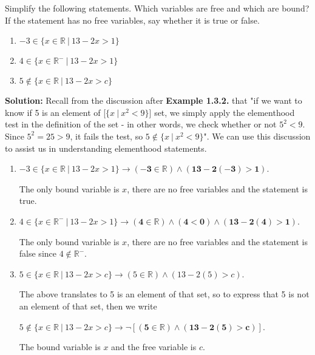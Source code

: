 Simplify the following statements. Which variables are free and which are bound? If the statement has no free variables, say whether it is true or false.
\begin{enumerate}[label=(\alph*)]
    \item $-3 \in \{x \in \mathbb{R} \ | \ 13-2x > 1 \}$
    \item $4 \in \{x \in \mathbb{R}^- \ | \ 13-2x > 1 \}$
    \item $5 \notin \{x \in \mathbb{R} \ | \ 13-2x > c \}$
\end{enumerate}

\textbf{Solution:} Recall from the discussion after \textbf{Example 1.3.2.} that "if we want to know if 5 is an element of [$\{x \ | \ x^2 < 9 \}$] set, we simply apply the elementhood test in the definition of the set - in other words, we check whether or not $5^2 < 9$. Since $5^2=25>9$, it fails the test, so $5 \notin \{x \ | \ x^2 < 9\}$". We can use this discussion to assist us in understanding elementhood statements.
\begin{enumerate}[label=(\alph*)]
    \item $-3 \in \{x \in \mathbb{R} \ | \ 13-2x > 1 \} \rightarrow \bm{(-3 \in \mathbb{R}) \wedge (13-2(-3)>1)}$.
    
    The only bound variable is $x$, there are no free variables and the statement is true.
    
    \item $4 \in \{x \in \mathbb{R}^- \ | \ 13-2x > 1 \} \rightarrow \bm{(4 \in \mathbb{R}) \wedge (4 < 0) \wedge (13-2(4)>1)}$.
    
    The only bound variable is $x$, there are no free variables and the statement is false since $4 \notin \mathbb{R}^-$.

    \item $5 \in \{x \in \mathbb{R} \ | \ 13-2x > c \} \rightarrow (5 \in \mathbb{R}) \wedge (13-2(5) > c)$.
    
    The above translates to 5 is an element of that set, so to express that 5 is not an element of that set, then we write 
    
    $5 \notin \{x \in \mathbb{R} \ | \ 13-2x > c \} \rightarrow \bm{\neg [(5 \in \mathbb{R}) \wedge (13-2(5) > c)]}$.

    The bound variable is $x$ and the free variable is $c$.
\end{enumerate}

\pagebreak